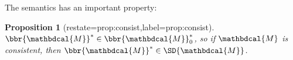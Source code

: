 \documentclass[letterpaper]{article} %
\theoremstyle{plain}
\newtheorem{prop}[theorem]{Proposition}
\theoremstyle{definition}
\theoremstyle{remark}
\DeclareMathOperator*{\argmin}{arg\;min}
\newcommand{\commentout}[1]{\ignorespaces}
\newcommand{\V}{\mathcal V}
\newcommand{\dg}[1]{\mathbdcal{#1}}
\newcommand{\begthm}[2]{\begin{#1}[restate=#2,label=#2]}
\begin{document}
\commentout{
\begin{prop}\label{prop:convex-if-gamma-small}
  If $\dg M$ is a PDG and
  $\gamma < \min_L \beta_L^{\dg M}$, then
  $\bbr{\dg M}_\gamma$ is a strictly convex function of $\mu$.%
\end{prop}

                          
                          
\Cref{prop:convex-if-gamma-small} allows us to define our desired
semantics by ensuring the limit%
	\footnote{$\mu$ is in this limit iff there is a sequence $(\gamma_i, \mu_i)_{i \in \mathbb N}$ with $\gamma_i \to 0$ and $\mu_i \to \mu$ such that $\mu_i \in \bbr{\dg M}_{\gamma_i}$ for all $i$.}
 in \eqref{eq:uniqdist} is well-defined.
	
	\begin{equation}
		 \bbr{\dg M}_* := \lim_{\gamma\to 0^+}\argmin_{\mu \in
				   \Delta\V(\dg M)} \bbr{\dg M}_\gamma(\mu). 
		   \label{eq:uniqdist}
	\end{equation}
}
The semantics has an important property: 
\begthm{prop}{prop:consist}
$\bbr{\dg M}^* \in \bbr{\dg M}_0^*$, so if $\dg M$ is consistent,
then $\bbr{\dg M}^* \in \SD{\dg  M}$.
\end{prop}

\end{document}
